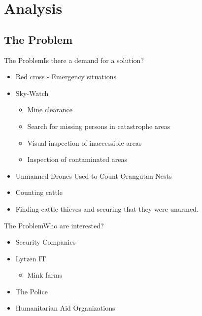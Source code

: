 \author{Bjarke Hesthaven Søndergaard}



\section{Analysis}
\subsection{The Problem}
\begin{frame}{The Problem}{Is there a demand for a solution?}
    \begin{itemize}
        \item Red cross - Emergency situations
        \item Sky-Watch
        \begin{itemize}
            \item Mine clearance
            \item Search for missing persons in catastrophe areas
            \item Visual inspection of inaccessible areas
            \item Inspection of contaminated areas
        \end{itemize}
        \item Unmanned Drones Used to Count Orangutan Nests
        \item Counting cattle
        \item Finding cattle thieves and securing that they were unarmed.
    \end{itemize}
\end{frame}

\begin{frame}{The Problem}{Who are interested?}
    \begin{itemize}
        \item Security Companies
        \item Lytzen IT
        \begin{itemize}
            \item Mink farms
        \end{itemize}
        \item The Police
        \item Humanitarian Aid Organizations
    \end{itemize}
\end{frame}

